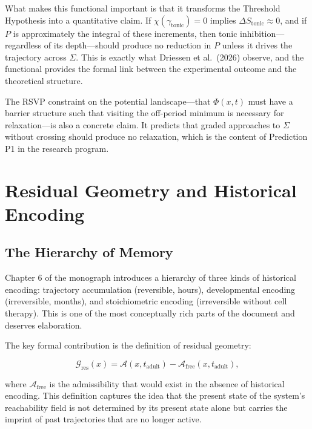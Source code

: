 \documentclass[12pt, a4paper]{article}
\theoremstyle{definition}
\begin{document}
What makes this functional important is that it transforms the Threshold Hypothesis into a quantitative claim. If $\chi(\gamma_{\mathrm{tonic}}) = 0$ implies $\Delta S_{\mathrm{tonic}} \approx 0$, and if $P$ is approximately the integral of these increments, then tonic inhibition---regardless of its depth---should produce no reduction in $P$ unless it drives the trajectory across $\Sigma$. This is exactly what Driessen et al.\ (2026) observe, and the functional provides the formal link between the experimental outcome and the theoretical structure.

The RSVP constraint on the potential landscape---that $\Phi(x,t)$ must have a barrier structure such that visiting the off-period minimum is necessary for relaxation---is also a concrete claim. It predicts that graded approaches to $\Sigma$ without crossing should produce no relaxation, which is the content of Prediction P1 in the research program.

\section{Residual Geometry and Historical Encoding}

\subsection{The Hierarchy of Memory}

Chapter 6 of the monograph introduces a hierarchy of three kinds of historical encoding: trajectory accumulation (reversible, hours), developmental encoding (irreversible, months), and stoichiometric encoding (irreversible without cell therapy). This is one of the most conceptually rich parts of the document and deserves elaboration.

The key formal contribution is the definition of residual geometry:

\begin{equation}
\mathcal{G}_{\mathrm{res}}(x) = \mathcal{A}(x, t_{\mathrm{adult}}) - \mathcal{A}_{\mathrm{free}}(x, t_{\mathrm{adult}}),
\end{equation}

where $\mathcal{A}_{\mathrm{free}}$ is the admissibility that would exist in the absence of historical encoding. This definition captures the idea that the present state of the system's reachability field is not determined by its present state alone but carries the imprint of past trajectories that are no longer active.
\end{document}
